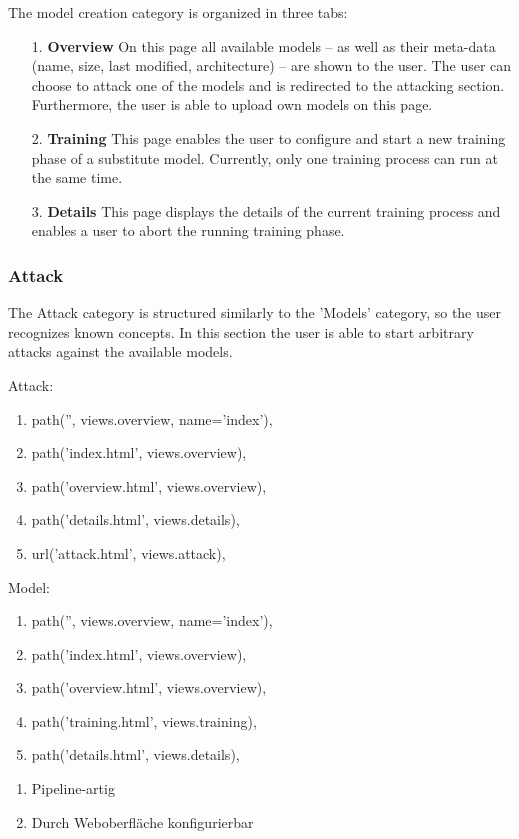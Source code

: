The model creation category is organized in three tabs:

\begin{enumerate}
\item[1.] \textbf{Overview}
On this page all available models -- as well as their meta-data (name, size, last modified, architecture) -- are shown to the user. The user can choose to attack one of the models and is redirected to the attacking section. Furthermore, the user is able to upload own models on this page.
\item[2.] \textbf{Training}
This page enables the user to configure and start a new training phase of a substitute model. Currently, only one training process can run at the same time.
\item[3.] \textbf{Details}
This page displays the details of the current training process and enables a user to abort the running training phase.
\end{enumerate}

\subsubsection{Attack}

The Attack category is structured similarly to the 'Models' category, so the user recognizes known concepts. In this section the user is able to start arbitrary attacks against the available models.

Attack:
\begin{enumerate}
\item path('', views.overview, name='index'),
\item path('index.html', views.overview),
\item path('overview.html', views.overview),
\item path('details.html', views.details),
\item url('attack.html', views.attack),


\end{enumerate}

Model:
\begin{enumerate}
\item path('', views.overview, name='index'),
\item path('index.html', views.overview),
\item path('overview.html', views.overview),
\item path('training.html', views.training),
\item path('details.html', views.details),



\end{enumerate}

\begin{enumerate}
\item Pipeline-artig
\item Durch Weboberfläche konfigurierbar
\end{enumerate}